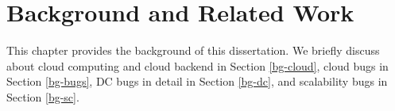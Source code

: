 \chapter{Background and Related Work}
\label{chp-bg}

This chapter provides the background of this dissertation. We briefly discuss
about cloud computing and cloud backend in Section \ref{bg-cloud}, cloud bugs
in Section \ref{bg-bugs}, DC bugs in detail in Section \ref{bg-dc}, and
scalability bugs in Section \ref{bg-sc}. 
%



%


